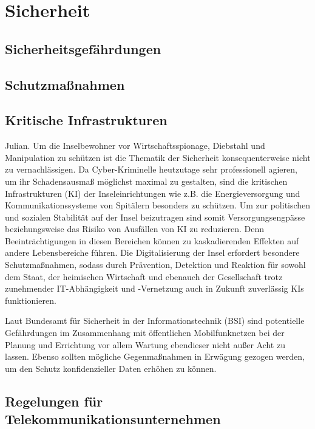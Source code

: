 
%
%
% 
% 
% 

\section{Sicherheit}
\label{sec:sicherheit}
\subsection{Sicherheitsgefährdungen}
\subsection{Schutzmaßnahmen}
\subsection{Kritische Infrastrukturen}

Julian.
Um die Inselbewohner vor Wirtschaftsspionage, Diebstahl und Manipulation zu schützen ist die Thematik der Sicherheit konsequenterweise nicht zu vernachlässigen. Da Cyber-Kriminelle heutzutage sehr professionell agieren, um ihr Schadensausmaß möglichst maximal zu gestalten, sind die kritischen Infrastrukturen (KI) der Inseleinrichtungen wie z.B. die Energieversorgung und Kommunikationssysteme von Spitälern besonders zu schützen. Um zur politischen und sozialen Stabilität auf der Insel beizutragen sind somit Versorgungsengpässe beziehungsweise das Risiko von Ausfällen von KI zu reduzieren. Denn Beeinträchtigungen in diesen Bereichen können zu kaskadierenden Effekten auf andere Lebensbereiche führen. Die Digitalisierung der Insel erfordert besondere Schutzmaßnahmen, sodass durch Prävention, Detektion und Reaktion für sowohl dem Staat, der heimischen Wirtschaft und ebenauch der Gesellschaft trotz zunehmender IT-Abhängigkeit und -Vernetzung auch in Zukunft zuverlässig KIs funktionieren.\cite{BSI17} 

Laut Bundesamt für Sicherheit in der Informationstechnik (BSI) sind potentielle Gefährdungen im Zusammenhang mit öffentlichen Mobilfunknetzen bei der Planung und Errichtung vor allem Wartung ebendieser nicht außer Acht zu lassen. Ebenso sollten mögliche Gegenmaßnahmen in Erwägung gezogen werden, um den Schutz konfidenzieller Daten erhöhen zu können. \cite{Ger08}

\subsection{Regelungen für Telekommunikationsunternehmen}

